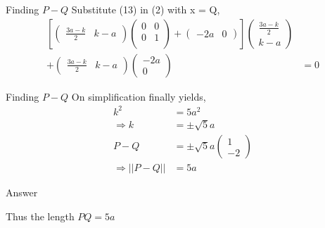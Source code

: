 \documentclass[12pt]{beamer}
\begin{document}
\begin{frame}{Finding $P-Q$}
Substitute (13) in (2) with x = Q, \\
\begin{align*}
    \left[ \left({\begin{array}{cc}\frac{3a-k}{2}  & k-a\end{array}}\right)\left( {\begin{array}{cc} 0 & 0 \\ 0 & 1 \\ \end{array}} \right) + \left({\begin{array}{cc}-2a &  0\end{array}}\right) \right]\left( \begin{array}{c}\frac{3a-k}{2} \\ k-a \end{array} \right) \\ + \left({\begin{array}{cc}\frac{3a-k}{2} &  k-a\end{array}}\right) \left({\begin{array}{c}-2a \\  0\end{array}}\right) &= 0
\end{align*}
\end{frame}
\begin{frame}{Finding $P-Q$}
On simplification finally yields, \\
\begin{align*}
     k^2 &= 5a^2 \\ \Rightarrow k &= \pm \sqrt{5} a \\
     P-Q &= \pm \sqrt{5}a \left({\begin{array}{c}1 \\  -2\end{array}}\right) \\
     \Rightarrow ||P-Q|| &= 5a
\end{align*}
\begin{block}{Answer}
\begin{center}
Thus the length $ PQ = 5a $ 
\end{center}
\end{block}
\end{frame}
\end{document}
